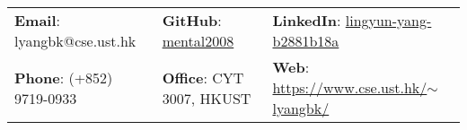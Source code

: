 \documentclass[letterpaper, 11pt]{article}
\begin{document}


\setlength{\tabcolsep}{8pt}


\vspace{0.5cm} 
\begin{center}
\begin{tabular}{lll}
\textbf{Email}: lyangbk@cse.ust.hk &
\hspace{0.25in} \textbf{GitHub}: \href{https://github.com/mental2008}{mental2008} &
\hspace{0.1in} \textbf{LinkedIn}: \href{https://www.linkedin.com/in/lingyun-yang-b2881b18a/}{lingyun-yang-b2881b18a} \\

\textbf{Phone}: (+852) 9719-0933 & 
\hspace{0.25in} \textbf{Office}: CYT 3007, HKUST & 
\hspace{0.1in} \textbf{Web}: \href{https://www.cse.ust.hk/~lyangbk/}{https://www.cse.ust.hk/$\sim$lyangbk/} \\ 
\end{tabular}
\end{center}
\end{document}
